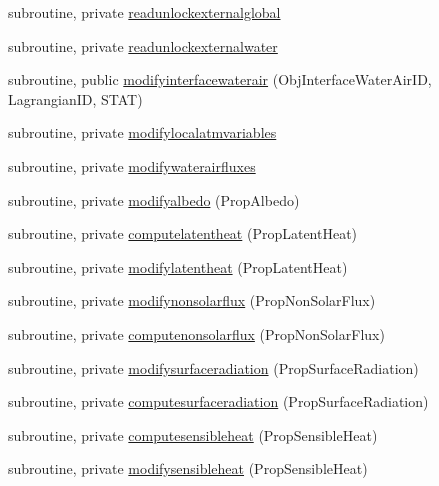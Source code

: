 \begin{DoxyCompactItemize}
\item 
subroutine, private \mbox{\hyperlink{namespacemoduleinterfacewaterair_ada112545191c798704451772d5803ea0}{readunlockexternalglobal}}
\item 
subroutine, private \mbox{\hyperlink{namespacemoduleinterfacewaterair_a380a0dfa2a33b7c2eef433d69fdf7fef}{readunlockexternalwater}}
\item 
subroutine, public \mbox{\hyperlink{namespacemoduleinterfacewaterair_ad372fa1a038ce383360d4422cc25923d}{modifyinterfacewaterair}} (Obj\+Interface\+Water\+Air\+ID, Lagrangian\+ID, S\+T\+AT)
\item 
subroutine, private \mbox{\hyperlink{namespacemoduleinterfacewaterair_a44a9529a1162816a090c836bc75d3f29}{modifylocalatmvariables}}
\item 
subroutine, private \mbox{\hyperlink{namespacemoduleinterfacewaterair_a91edae849454c0ec7ebcefd91556486e}{modifywaterairfluxes}}
\item 
subroutine, private \mbox{\hyperlink{namespacemoduleinterfacewaterair_ad58b286425c066f4643dc56d5a605645}{modifyalbedo}} (Prop\+Albedo)
\item 
subroutine, private \mbox{\hyperlink{namespacemoduleinterfacewaterair_a5442677ffd4780b9f170ffed821b8185}{computelatentheat}} (Prop\+Latent\+Heat)
\item 
subroutine, private \mbox{\hyperlink{namespacemoduleinterfacewaterair_a75fdc03352ad6627e770e22eddc20f05}{modifylatentheat}} (Prop\+Latent\+Heat)
\item 
subroutine, private \mbox{\hyperlink{namespacemoduleinterfacewaterair_a9ae768b301ebc2c73524836b992b568d}{modifynonsolarflux}} (Prop\+Non\+Solar\+Flux)
\item 
subroutine, private \mbox{\hyperlink{namespacemoduleinterfacewaterair_a440fa94544c221014817ea4b5bea703a}{computenonsolarflux}} (Prop\+Non\+Solar\+Flux)
\item 
subroutine, private \mbox{\hyperlink{namespacemoduleinterfacewaterair_a57d8dae2ec14a4562c48bbccb24a5f96}{modifysurfaceradiation}} (Prop\+Surface\+Radiation)
\item 
subroutine, private \mbox{\hyperlink{namespacemoduleinterfacewaterair_ac9ef1ef38af46f9428d5e550057e60b9}{computesurfaceradiation}} (Prop\+Surface\+Radiation)
\item 
subroutine, private \mbox{\hyperlink{namespacemoduleinterfacewaterair_abe46b3644f7d36d7d60cc3a86eb0de5f}{computesensibleheat}} (Prop\+Sensible\+Heat)
\item 
subroutine, private \mbox{\hyperlink{namespacemoduleinterfacewaterair_a2724f68137207e7ade1ca13b482d8f81}{modifysensibleheat}} (Prop\+Sensible\+Heat)

\end{DoxyCompactItemize}
